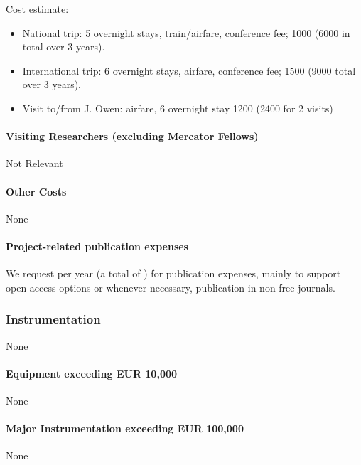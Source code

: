 \documentclass[10pt,fleqn,twoside]{article}
\begin{document}
Cost estimate: 
\begin{itemize}
\item National trip: 5 overnight stays, train/airfare,
conference fee; 1000 \EUR{} (6000 in total over 3 years).
\item International trip: 6 overnight stays, airfare, conference fee;
  1500 \EUR{} (9000 total over 3 years).
\item Visit to/from J. Owen: airfare, 6 overnight stay 1200 \EUR{} (2400
  for 2 visits)
\end{itemize}

\paragraph{Visiting Researchers (excluding Mercator Fellows)}

Not Relevant 

\paragraph{Other Costs}

None

\paragraph{Project-related publication expenses}

We request  per year (a total of ) for publication
expenses, mainly to support open access options or whenever necessary,
publication in non-free journals.

\subsubsection{Instrumentation}

None 

\paragraph{Equipment exceeding EUR 10,000} 

None

\paragraph{Major Instrumentation exceeding EUR 100,000} 

None 
\end{document}
